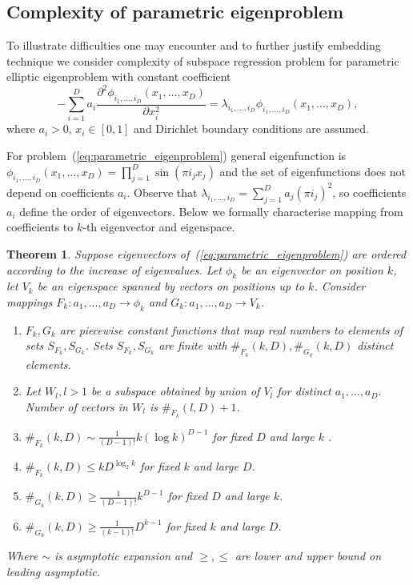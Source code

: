 \documentclass{article}
\newtheorem{theorem}{Theorem}
\begin{document}
\subsection{Complexity of parametric eigenproblem}
To illustrate difficulties one may encounter and to further justify embedding technique we consider complexity of subspace regression problem for parametric elliptic eigenproblem with constant coefficient
\begin{equation}
	\label{eq:parametric_eigenproblem}
	-\sum_{i=1}^{D} a_i \frac{\partial^2 \phi_{i_1,\dots,i_D}(x_1,\dots, x_D)}{\partial x_i^2} = \lambda_{i_1,\dots,i_D}\phi_{i_1,\dots,i_D}(x_1,\dots, x_D),
\end{equation}
where $a_i > 0$, $x_i\in[0, 1]$ and Dirichlet boundary conditions are assumed.

For problem~(\ref{eq:parametric_eigenproblem}) general eigenfunction is $\phi_{i_1,\dots,i_D}(x_1,\dots, x_D) = \prod_{j=1}^{D}\sin(\pi i_j x_j)$ and the set of eigenfunctions does not depend on coefficients $a_i$. Observe that $\lambda_{i_1,\dots,i_D} = \sum_{j=1}^{D} a_j\left(\pi i_j\right)^2$, so coefficients $a_i$ define the order of eigenvectors. Below we formally characterise mapping from coefficients to $k$-th eigenvector and eigenspace.
\begin{theorem}
	\label{th:parametric_eigenproblem}
	Suppose eigenvectors of~(\ref{eq:parametric_eigenproblem}) are ordered according to the increase of eigenvalues. Let $\phi_k$ be an eigenvector on position $k$, let $V_{k}$ be an eigenspace spanned by vectors on positions up to $k$. Consider mappings $F_{k}: a_1,\dots, a_D \rightarrow \phi_k$ and $G_{k}: a_1,\dots, a_D \rightarrow V_k$.
	\begin{enumerate}
		\item $F_{k}, G_{k}$ are piecewise constant functions that map real numbers to elements of sets $S_{F_{k}}, S_{G_{k}}$. Sets $S_{F_{k}}, S_{G_{k}}$ are finite with $\#_{F_{k}}(k, D), \#_{G_{k}}(k, D)$ distinct elements.
		\item Let $W_l, l>1$ be a subspace obtained by union of $V_l$ for distinct $a_1,\dots,a_D$. Number of vectors in $W_{l}$ is $\#_{F_{k}}(l, D) + 1$.
		\item $\#_{F_{k}}(k, D)\sim\frac{1}{(D-1)!} k \left(\log k\right)^{D-1}$ for fixed $D$ and large $k$ .
		\item $\#_{F_{k}}(k, D) \leq k D^{\log_2 k}$ for fixed $k$ and large $D$.
		\item $\#_{G_{k}}(k, D) \geq \frac{1}{(D-1)!}k^{D-1}$ for fixed $D$ and large $k$.
		\item $\#_{G_{k}}(k, D) \geq \frac{1}{(k-1)!}D^{k-1}$ for fixed $k$ and large $D$.
	\end{enumerate}
	Where $\sim$ is asymptotic expansion and $\geq, \leq$ are lower and upper bound on leading asymptotic.
\end{theorem}
\end{document}
